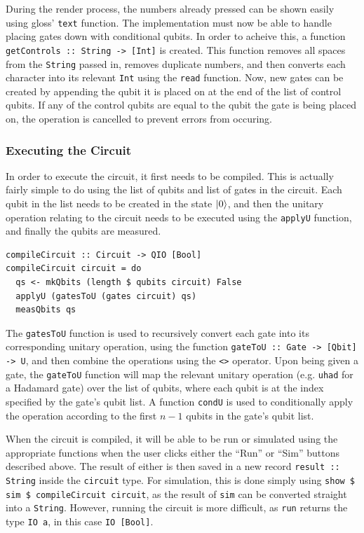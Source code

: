 \documentclass[a4paper,10pt, titlepage, twoside]{article}
\begin{document}
During the render process, the numbers already pressed can be shown easily using gloss' \texttt{text} function. The implementation must now be able to handle placing gates down with conditional qubits. In order to acheive this, a function \texttt{getControls :: String -> [Int]} is created. This function removes all spaces from the \texttt{String} passed in, removes duplicate numbers, and then converts each character into its relevant \texttt{Int} using the \texttt{read} function. Now, new gates can be created by appending the qubit it is placed on at the end of the list of control qubits. If any of the control qubits are equal to the qubit the gate is being placed on, the operation is cancelled to prevent errors from occuring.\par 

\subsubsection{Executing the Circuit}
In order to execute the circuit, it first needs to be compiled. This is actually fairly simple to do using the list of qubits and list of gates in the circuit. Each qubit in the list needs to be created in the state $\ket 0$, and then the unitary operation relating to the circuit needs to be executed using the \texttt{applyU} function, and finally the qubits are measured.\par
\begin{verbatim}
compileCircuit :: Circuit -> QIO [Bool]
compileCircuit circuit = do
  qs <- mkQbits (length $ qubits circuit) False
  applyU (gatesToU (gates circuit) qs)
  measQbits qs
\end{verbatim}
The \texttt{gatesToU} function is used to recursively convert each gate into its corresponding unitary operation, using the function \texttt{gateToU :: Gate -> [Qbit] -> U}, and then combine the operations using the \texttt{<>} operator. Upon being given a gate, the \texttt{gateToU} function will map the relevant unitary operation (e.g. \texttt{uhad} for a Hadamard gate) over the list of qubits, where each qubit is at the index specified by the gate's qubit list. A function \texttt{condU} is used to conditionally apply the operation according to the first $n-1$ qubits in the gate's qubit list.\par
When the circuit is compiled, it will be able to be run or simulated using the appropriate functions when the user clicks either the ``Run'' or ``Sim'' buttons described above. The result of either is then saved in a new record \texttt{result :: String} inside the \texttt{circuit} type. For simulation, this is done simply using \texttt{show \$ sim \$ compileCircuit circuit}, as the result of \texttt{sim} can be converted straight into a \texttt{String}. However, running the circuit is more difficult, as \texttt{run} returns the type \texttt{IO a}, in this case \texttt{IO [Bool]}.\par
\end{document}
